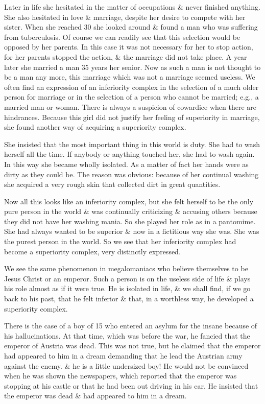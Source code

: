 \documentclass{article}
\begin{document}
Later in life she hesitated in the matter of occupations \& never finished anything. She also hesitated in love \& marriage, despite her desire to compete with her sister. When she reached 30 she looked around \& found a man who was suffering from tuberculosis. Of course we can readily see that this selection would be opposed by her parents. In this case it was not necessary for her to stop action, for her parents stopped the action, \& the marriage did not take place. A year later she married a man 35 years her senior. Now as such a man is not thought to be a man any more, this marriage which was not a marriage seemed useless. We often find an expression of an inferiority complex in the selection of a much older person for marriage or in the selection of a person who cannot be married; e.g., a married man or woman. There is always a suspicion of cowardice when there are hindrances. Because this girl did not justify her feeling of superiority in marriage, she found another way of acquiring a superiority complex.

She insisted that the most important thing in this world is duty. She had to wash herself all the time. If anybody or anything touched her, she had to wash again. In this way she became wholly isolated. As a matter of fact her hands were as dirty as they could be. The reason was obvious: because of her continual washing she acquired a very rough skin that collected dirt in great quantities.

Now all this looks like an inferiority complex, but she felt herself to be the only pure person in the world \& was continually criticizing \& accusing others because they did not have her washing mania. So she played her role as in a pantomime. She had always wanted to be superior \& now in a fictitious way she was. She was the purest person in the world. So we see that her inferiority complex had become a superiority complex, very distinctly expressed.

We see the same phenomenon in megalomaniacs who believe themselves to be Jesus Christ or an emperor. Such a person is on the useless side of life \& plays his role almost as if it were true. He is isolated in life, \& we shall find, if we go back to his past, that he felt inferior \& that, in a worthless way, he developed a superiority complex.

There is the case of a boy of 15 who entered an asylum for the insane because of his hallucinations. At that time, which was before the war, he fancied that the emperor of Austria was dead. This was not true, but he claimed that the emperor had appeared to him in a dream demanding that he lead the Austrian army against the enemy. \& he is a little undersized boy! He would not be convinced when he was shown the newspapers, which reported that the emperor was stopping at his castle or that he had been out driving in his car. He insisted that the emperor was dead \& had appeared to him in a dream.
\end{document}
